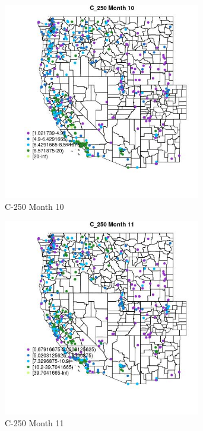 \clearpage 

\begin{figure} 
\centering  
\includegraphics[width=0.77\textwidth]{Code_Outputs/ML_input_report_ML_input_PM25_Step5_part_d_de_duplicated_aves_ML_input_MapObsMo10C_250.jpg} 
\caption{\label{fig:ML_input_report_ML_input_PM25_Step5_part_d_de_duplicated_aves_ML_inputMapObsMo10C_250}C-250 Month 10} 
\end{figure} 
 

\begin{figure} 
\centering  
\includegraphics[width=0.77\textwidth]{Code_Outputs/ML_input_report_ML_input_PM25_Step5_part_d_de_duplicated_aves_ML_input_MapObsMo11C_250.jpg} 
\caption{\label{fig:ML_input_report_ML_input_PM25_Step5_part_d_de_duplicated_aves_ML_inputMapObsMo11C_250}C-250 Month 11} 
\end{figure} 
 

